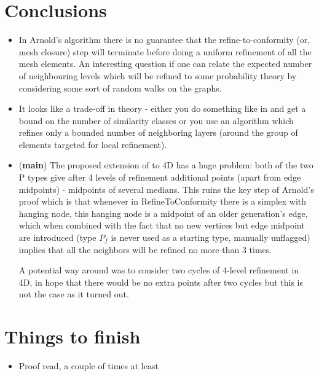 \documentclass[a4paper,12pt]{amsart}
\numberwithin{equation}{section}
\begin{document}
\section{Conclusions}
\begin{itemize}
	\item In Arnold's algorithm there is no guarantee that the refine-to-conformity (or, mesh closure) step will terminate before doing a uniform refinement of all the mesh elements. An interesting question if one can relate the expected number of neighbouring levels which will be refined to some probability theory by considering some sort of random walks on the graphs.
	\item It looks like a trade-off in theory - either you do something like in \cite{arnold} and get a bound on the number of similarity classes or you use an algorithm which refines only a bounded number of neighboring layers (around the group of elements targeted for local refinement).
	\item (\textbf{main}) The proposed extension of \cite{arnold} to 4D has a huge problem: both of the two P types give after 4 levels of refinement additional points (apart from edge midpoints) - midpoints of several medians. This ruins the key step of Arnold's proof which is that whenever in RefineToConformity there is a simplex with hanging node, this hanging node is a midpoint of an older generation's edge, which when combined with the fact that no new vertices but edge midpoint are introduced (type $P_f$ is never used as a starting type, manually unflagged) implies that all the neighbors will be refined no more than 3 times.
	
	A potential way around was to consider two cycles of 4-level refinement in 4D, in hope that there would be no extra points after two cycles but this is not the case as it turned out.
\end{itemize}

\section{Things to finish}
\begin{itemize}
	\item Proof read, a couple of times at least
\end{itemize}
\end{document}

